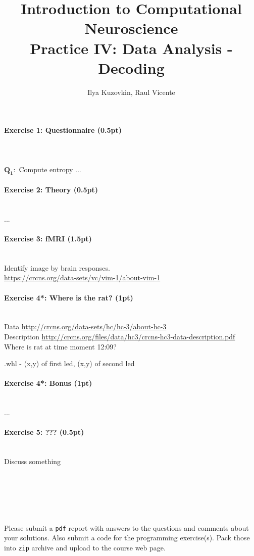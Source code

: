 \documentclass[a4paper,11pt]{article}
\author{\large{Ilya Kuzovkin, Raul Vicente}}
\title{\huge{Introduction to Computational Neuroscience}\\\LARGE{Practice IV: Data Analysis - Decoding}}
\newenvironment{exercise}[3]{\paragraph{Exercise #1: #2 (#3pt)}\ \\}{
\medskip}
\newcommand{\question}[2]{\setlength\parindent{0mm}\ \\$\mathbf{Q_#1:}$ #2\ \\}
\begin{document}
\maketitle

\begin{exercise}{1}{Questionnaire}{0.5}
\question{1}{Compute entropy ...}
\end{exercise}

\begin{exercise}{2}{Theory}{0.5}
...
\end{exercise}

\begin{exercise}{3}{fMRI}{1.5}
Identify image by brain responses.\\
\url{https://crcns.org/data-sets/vc/vim-1/about-vim-1}

\end{exercise}


\begin{exercise}{4*}{Where is the rat?}{1}
Data \url{http://crcns.org/data-sets/hc/hc-3/about-hc-3}\\
Description \url{http://crcns.org/files/data/hc3/crcns-hc3-data-description.pdf}\\
Where is rat at time moment 12:09?

.whl - (x,y) of first led, (x,y) of second led
\end{exercise}


\begin{exercise}{4*}{Bonus}{1}
...
\end{exercise}

\begin{exercise}{5}{???}{0.5}
Discuss something
\end{exercise}

\ \\
\ \\
\ \\
\ \\
\ \\
Please submit a \texttt{pdf} report with answers to the questions and comments about your solutions. Also submit a code for the programming exercise(s). Pack those into \texttt{zip} archive and upload to the course web page.
\end{document}
